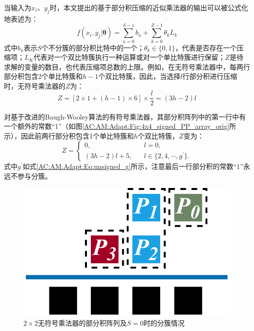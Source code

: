 当输入为$x_i$、$y_j$时，本文提出的基于部分积压缩的近似乘法器的输出可以被公式化地表述为：
\begin{equation}
\label{AC:AM:Adapt:Eq:f}
    f(x_i, y_j \vert \boldsymbol{\theta}) =  \sum\limits_{u=0}^{S-1} b_u + \sum\limits_{k=0}^{Z-1} \theta_k L_k
\end{equation}
式中$b_u$表示$S$个不分簇的部分积比特中的一个；$\theta_k \in \{0, 1\}$，代表是否存在一个压缩项；$L_K$代表对一个双比特簇执行一种运算或对一个单比特簇进行保留；$Z$是待求解的变量的数目，也代表压缩项总数的上限。例如，在无符号乘法器中，每两行部分积包含2个单比特簇和$h-1$个双比特簇，因此，当选择$l$行部分积进行压缩时，无符号乘法器的$Z$为：
\begin{equation}
    \label{AC:AM:Adapt:Eq:Z_unsigned}
      Z = [2 \times 1 + (h-1) \times 6] \times \frac{l}{2} = (3h-2)l
\end{equation}

对基于改进的Baugh-Wooley算法的有符号乘法器，其部分积阵列中的第一行中有一个额外的常数“1”（如图\ref{AC:AM:Adapt:Fig:4x4_signed_PP_array_orig}所示），因此前两行部分积包含1个单比特簇和$h$个双比特簇，$Z$变为：
\begin{equation}
    \label{AC:AM:Adapt:Eq:Z_signed}
        Z = \left\{
          \begin{aligned}
            0 , \ \ \ \ \ \  & \ \ \ \ l = 0, \\
            (3h-2)l + 5, & \ \ \ \  l \in \{2, 4, \cdots, g^{\prime} \}.
            \end{aligned}
          \right.
\end{equation}
式中$g^{\prime}$如式\eqref{AC:AM:Adapt:Eq:unsigned_g}所示，注意最后一行部分积的常数“1”永远不参与分簇。

\begin{figure}[!ht]
    \centering
    \includegraphics[width=0.3\linewidth]{./figs/AC-AM-Adapt-2x2_unsigned_PP_array_orig.pdf}
    \caption{$2\times2$无符号乘法器的部分积阵列及$S = 0$时的分簇情况}
    \label{AC:AM:Adapt:Fig:2x2_unsigned_PP_array_ori}
\end{figure}

